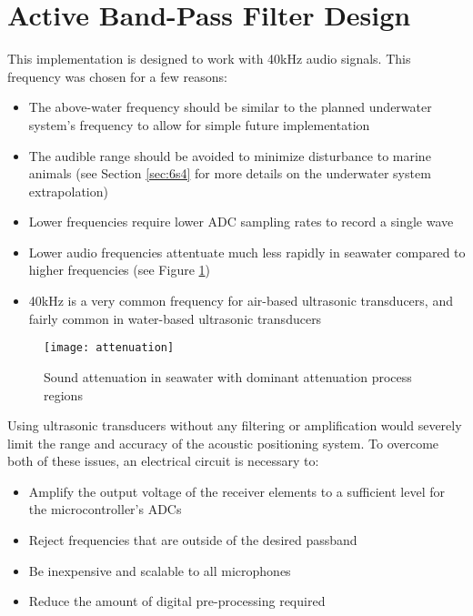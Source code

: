 \documentclass[12pt,a4paper]{report}
\begin{document}
\section{Active Band-Pass Filter Design} \label{sec:3s4}
This implementation is designed to work with 40kHz audio signals. This frequency was chosen for a few reasons:
\begin{itemize}[noitemsep,topsep=0pt,]
	\item The above-water frequency should be similar to the planned underwater system’s frequency to allow for simple future implementation
	\item The audible range should be avoided to minimize disturbance to marine animals (see Section \ref{sec:6s4} for more details on the underwater system extrapolation)
	\item Lower frequencies require lower ADC sampling rates to record a single wave
	\item Lower audio frequencies attentuate much less rapidly in seawater compared to higher frequencies (see Figure \ref{fig:attenuation})
	\item 40kHz is a very common frequency for air-based ultrasonic transducers, and fairly common in water-based ultrasonic transducers
\end{itemize}

\pagebreak

\begin{figure}[htbp]
	\centering
	\texttt{[image: attenuation]}
	\caption{Sound attenuation in seawater with dominant attenuation process regions \cite{computational}}
	\label{fig:attenuation}
\end{figure}

Using ultrasonic transducers without any filtering or amplification would severely limit the range and accuracy of the acoustic positioning system. To overcome both of these issues, an electrical circuit is necessary to:
\begin{itemize}[noitemsep,topsep=0pt,]
	\item Amplify the output voltage of the receiver elements to a sufficient level for the microcontroller’s ADCs
	\item Reject frequencies that are outside of the desired passband
	\item Be inexpensive and scalable to all microphones
	\item Reduce the amount of digital pre-processing required
\end{itemize}
\end{document}
